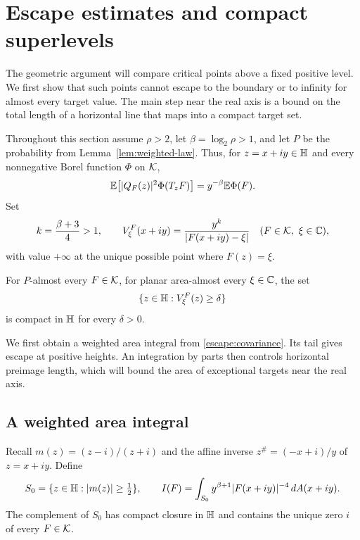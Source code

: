 \section{Escape estimates and compact superlevels}
\label{sec:escape}

The geometric argument will compare critical points above a fixed positive
level.  We first show that such points cannot escape to the boundary or to
infinity for almost every target value.  The main step near the real axis is
a bound on the total length of a horizontal line that maps into a compact
target set.

Throughout this section assume $\rho>2$, let $\beta=\log_2\rho>1$, and
let $P$ be the probability from Lemma~\ref{lem:weighted-law}.  Thus, for
$z=x+iy\in\mathbb H$ and every nonnegative Borel function $\Phi$ on $\mathcal K$,
\begin{equation}
 \mathbb E\!\left[|Q_F(z)|^2\Phi(T_zF)\right]
       =y^{-\beta}\mathbb E\Phi(F).
 \label{escape:covariance}
\end{equation}
Set
\begin{equation}
 k=\frac{\beta+3}{4}>1,\qquad
 V_\xi^F(x+iy)=\frac{y^k}{|F(x+iy)-\xi|}
 \quad(F\in\mathcal K,\ \xi\in\mathbb C),
 \label{escape:potential}
\end{equation}
with value $+\infty$ at the unique possible point where $F(z)=\xi$.

\begin{proposition}
\label{prop:proper-superlevels}
For $P$-almost every $F\in\mathcal K$, for planar area-almost every $\xi\in\mathbb C$,
the set
\[
 \{z\in\mathbb H:V_\xi^F(z)\ge\delta\}
\]
is compact in $\mathbb H$ for every $\delta>0$.
\end{proposition}

We first obtain a weighted area integral from
\eqref{escape:covariance}.  Its tail gives escape at positive heights.
An integration by parts then controls horizontal preimage length, which
will bound the area of exceptional targets near the real axis.

\subsection{A weighted area integral}

Recall $m(z)=(z-i)/(z+i)$ and the affine inverse
$z^\#=(-x+i)/y$ of $z=x+iy$.  Define
\begin{equation}
 S_0=\{z\in\mathbb H:|m(z)|\ge\tfrac12\},\qquad
 I(F)=\int_{S_0}y^{\beta+1}|F(x+iy)|^{-4}\,d A(x+iy).
 \label{escape:weighted-integral}
\end{equation}
The complement of $S_0$ has compact closure in $\mathbb H$ and contains the
unique zero $i$ of every $F\in\mathcal K$.

